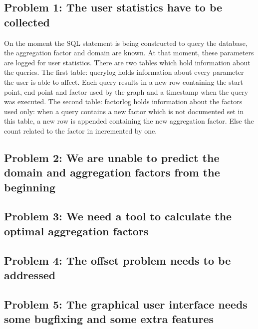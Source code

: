 \subsection{Problem 1: The user statistics have to be collected}
On the moment the SQL statement is being constructed to query the database, the aggregation factor and domain are known. At that moment, these parameters are logged for user statistics.
There are two tables which hold information about the queries. The first table: querylog holds information about every parameter the user is able to affect. Each query results in a new row containing the start point, end point and factor used by the graph and a timestamp when the query was executed. The second table: factorlog holds information about the factors used only: when a query contains a new factor which is not documented set in this table, a new row is appended containing the new aggregation factor. Else the count related to the factor in incremented by one.\\

\subsection{Problem 2: We are unable to predict the domain and aggregation factors from the beginning}

\subsection{Problem 3: We need a tool to calculate the optimal aggregation factors}
\subsection{Problem 4: The offset problem needs to be addressed}
\subsection{Problem 5: The graphical user interface needs some bugfixing and some extra features}